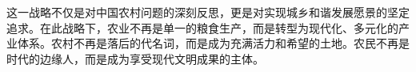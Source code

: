 这一战略不仅是对中国农村问题的深刻反思，更是对实现城乡和谐发展愿景的坚定追求。在此战略下，农业不再是单一的粮食生产，而是转型为现代化、多元化的产业体系。农村不再是落后的代名词，而是成为充满活力和希望的土地。农民不再是时代的边缘人，而是成为享受现代文明成果的主体。



